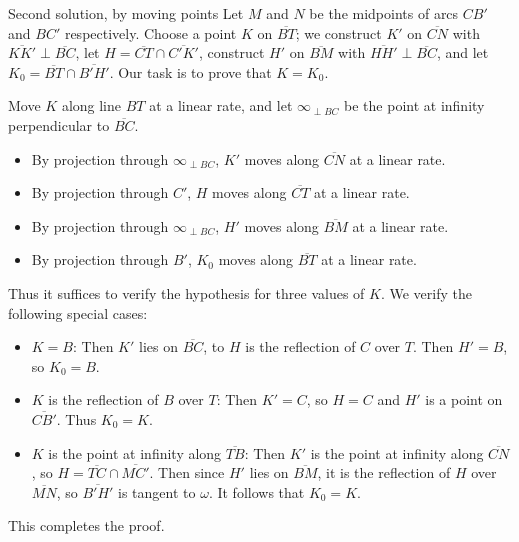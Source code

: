 \begin{customenv}{Second solution, by moving points}
    Let $M$ and $N$ be the midpoints of arcs $CB'$ and $BC'$ respectively. Choose a point $K$ on $\overline{BT}$; we construct $K'$ on $\overline{CN}$ with $\overline{KK'}\perp\overline{BC}$, let $H=\overline{CT}\cap\overline{C'K'}$, construct $H'$ on $\overline{BM}$ with $\overline{HH'}\perp\overline{BC}$, and let $K_0=\overline{BT}\cap\overline{B'H'}$. Our task is to prove that $K=K_0$.

    Move $K$ along line $BT$ at a linear rate, and let $\infty_{\perp BC}$ be the point at infinity perpendicular to $\overline{BC}$.
    \begin{itemize}[itemsep=0em]
        \item By projection through $\infty_{\perp BC}$, $K'$ moves along $\overline{CN}$ at a linear rate.
        \item By projection through $C'$, $H$ moves along $\overline{CT}$ at a linear rate.
        \item By projection through $\infty_{\perp BC}$, $H'$ moves along $\overline{BM}$ at a linear rate.
        \item By projection through $B'$, $K_0$ moves along $\overline{BT}$ at a linear rate.
    \end{itemize}
    Thus it suffices to verify the hypothesis for three values of $K$. We verify the following special cases:
    \begin{itemize}[itemsep=0em]
        \item $K=B$: Then $K'$ lies on $\overline{BC}$, to $H$ is the reflection of $C$ over $T$. Then $H'=B$, so $K_0=B$.
        \item $K$ is the reflection of $B$ over $T$: Then $K'=C$, so $H=C$ and $H'$ is a point on $\overline{CB'}$. Thus $K_0=K$.
        \item $K$ is the point at infinity along $\overline{TB}$: Then $K'$ is the point at infinity along $\overline{CN}$, so $H=\overline{TC}\cap\overline{MC'}$. Then since $H'$ lies on $\overline{BM}$, it is the reflection of $H$ over $\overline{MN}$, so $\overline{B'H'}$ is tangent to $\omega$. It follows that $K_0=K$.
    \end{itemize}
    This completes the proof.
\end{customenv}

